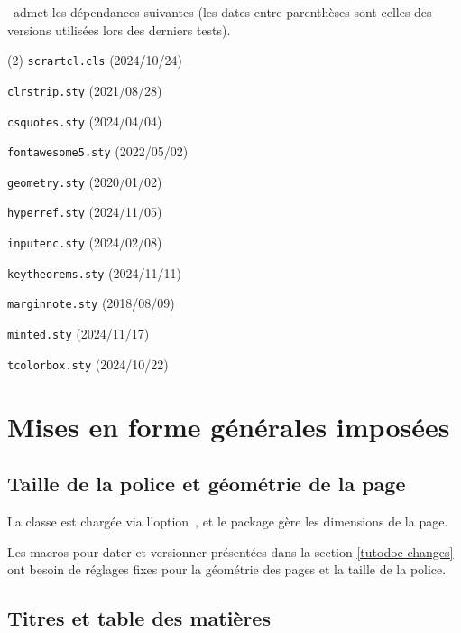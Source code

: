 \thisproj\ admet les dépendances suivantes (les dates entre parenthèses sont celles des versions utilisées lors des derniers tests).
%
\begin{tasks}[style=itemize](2)
    \task \texttt{scrartcl.cls}
    \hfill {\small (2024/10/24)}\kern10pt

    \task \texttt{clrstrip.sty}
    \hfill {\small (2021/08/28)}\kern10pt

    \task \texttt{csquotes.sty}
    \hfill {\small (2024/04/04)}\kern10pt

    \task \texttt{fontawesome5.sty}
    \hfill {\small (2022/05/02)}\kern10pt

    \task \texttt{geometry.sty}
    \hfill {\small (2020/01/02)}\kern10pt

    \task \texttt{hyperref.sty}
    \hfill {\small (2024/11/05)}\kern10pt

    \task \texttt{inputenc.sty}
    \hfill {\small (2024/02/08)}\kern10pt

    \task \texttt{keytheorems.sty}
    \hfill {\small (2024/11/11)}\kern10pt

    \task \texttt{marginnote.sty}
    \hfill {\small (2018/08/09)}\kern10pt

    \task \texttt{minted.sty}
    \hfill {\small (2024/11/17)}\kern10pt

    \task \texttt{tcolorbox.sty}
    \hfill {\small (2024/10/22)}\kern10pt
\end{tasks}


\section{Mises en forme générales imposées}

\subsection{Taille de la police et géométrie de la page}

La classe  est chargée via l'option \,, et le package  gère les dimensions de la page.


\begin{tdocwarn}
	Les macros pour dater et versionner présentées dans la section  \ref{tutodoc-changes} ont besoin de réglages fixes pour la géométrie des pages et la taille de la police.
\end{tdocwarn}


\subsection{Titres et table des matières}

